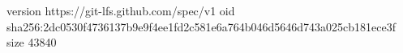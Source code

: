 version https://git-lfs.github.com/spec/v1
oid sha256:2dc0530f4736137b9e9f4ee1fd2c581e6a764b046d5646d743a025cb181ece3f
size 43840

